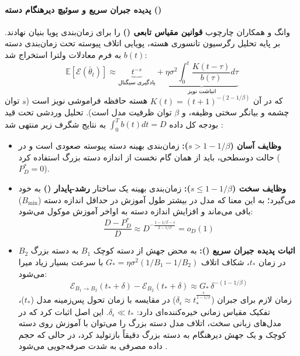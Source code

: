 \paragraph*{پدیده جبران سریع و سوئیچ دیرهنگام دسته ()}
وانگ و همکاران \cite{wang2026fastcatchup} چارچوب \textbf{قوانین مقیاس تابعی ()} را برای زمان‌بندی پویا بنیان نهادند. بر پایه تحلیل  رگرسیون تانسوری هسته، پویایی اتلاف پیوسته تحت زمان‌بندی دسته $b(t)$ به فرم معادلات ولترا استخراج شد:
\begin{equation}
    \mathbb{E}[\mathcal{E}(\bar{\theta}_t)] \approx \underbrace{t^{-s}}_{\text{یادگیری سیگنال}} + \underbrace{\eta \sigma^2 \int_0^t \frac{K(t - \tau)}{b(\tau)} d\tau}_{\text{انباشت نویز}}
\end{equation}
که در آن $K(t) = (t + 1)^{-(2 - 1/\beta)}$ هسته حافظه فراموشی نویز است ($s$ توان چشمه و بیانگر سختی وظیفه، و $\beta$ توان ظرفیت مدل است). تحلیل وردشی تحت قید بودجه کل داده $\int_0^T b(t) dt = D$ به نتایج شگرف زیر منتهی شد \cite{wang2026fastcatchup}:
\begin{itemize}
    \item \textbf{وظایف آسان ($s > 1 - 1/\beta$):} زمان‌بندی بهینه دسته پیوسته صعودی است و در حالت دوسطحی، باید از همان گام نخست از اندازه دسته بزرگ استفاده کرد ($P^*_D = 0$).
    \item \textbf{وظایف سخت ($s \le 1 - 1/\beta$):} زمان‌بندی بهینه یک ساختار \textbf{رشد-پایدار ()} به خود می‌گیرد؛ به این معنا که مدل در بیشتر طول آموزش در حداقل اندازه دسته ($B_{\min}$) باقی می‌ماند و افزایش اندازه دسته به اواخر آموزش موکول می‌شود:
    \begin{equation}
        \frac{D - P^*_D}{D} \approx D^{-\frac{1 - 1/\beta - s}{2 - 1/\beta}} = o_D(1)
    \end{equation}
    \item \textbf{اثبات پدیده جبران سریع ():} به محض جهش از دسته کوچک $B_1$ به دسته بزرگ $B_2$ در زمان $t_*$، شکاف اتلاف $G_* = \eta \sigma^2(1/B_1 - 1/B_2)$ با سرعت بسیار زیاد میرا می‌شود:
    \begin{equation}
        \mathcal{E}_{B_1 \to B_2}(t_* + \delta) - \mathcal{E}_{B_2}(t_* + \delta) \approx G_* \, \delta^{-(1 - 1/\beta)}
    \end{equation}
    زمان لازم برای جبران ($\delta_\epsilon \approx t_*^{\frac{s}{1 - 1/\beta}}$) در مقایسه با زمان تحول پس‌زمینه مدل ($t_*$)، تفکیک مقیاس زمانی خیره‌کننده‌ای دارد: $\delta_\epsilon \ll t_*$. این اصل اثبات کرد که در مدل‌های زبانی سخت، اتلاف مدل دسته بزرگ را می‌توان با آموزش روی دسته کوچک و یک جهش دیرهنگام به دسته بزرگ دقیقاً بازتولید کرد، در حالی که حجم داده مصرفی به شدت صرفه‌جویی می‌شود \cite{wang2026fastcatchup}.
\end{itemize}

